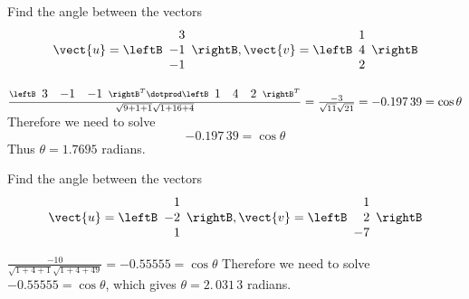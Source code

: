 \begin{enumialphparenastyle}

\begin{ex} Find the angle between the vectors 
\begin{equation*}
\vect{u}
=
\leftB
\begin{array}{r}
3 \\
-1 \\
-1
\end{array}
\rightB,
\vect{v}
=
\leftB
\begin{array}{r}
1 \\
4 \\
2
\end{array}
\rightB
\end{equation*}
\begin{sol}
 $\frac{\leftB \begin{array}{ccc} 
3 & -1 & -1
\end{array}
\rightB^T \dotprod
\leftB \begin{array}{ccc}
1 & 4 & 2
\end{array}
\rightB^T }{\sqrt{9+1+1}\sqrt{1+16+4}}= \frac{-3}{\sqrt{11}\sqrt{21}}= -0.197\,39=\cos \theta $ 
Therefore we need to solve
\[
-0.197\,39=\cos\theta 
\]
Thus $\theta =1.7695$ radians.
\end{sol}
\end{ex}

\begin{ex} Find the angle between the vectors 
\begin{equation*}
\vect{u}
=
\leftB
\begin{array}{r}
1 \\
-2 \\
1
\end{array}
\rightB,
\vect{v}
=
\leftB
\begin{array}{r}
1 \\
2 \\
-7
\end{array}
\rightB
\end{equation*}
\begin{sol}
 $\frac{-10}{\sqrt{1+4+1}\sqrt{1+4+49}}= -0.55555=\cos \theta $ 
Therefore we need to solve $-0.55555=\cos \theta $, which gives $\theta
=2.\,\allowbreak 031\,3$ radians.

\end{sol}
\end{ex}

\end{enumialphparenastyle}
